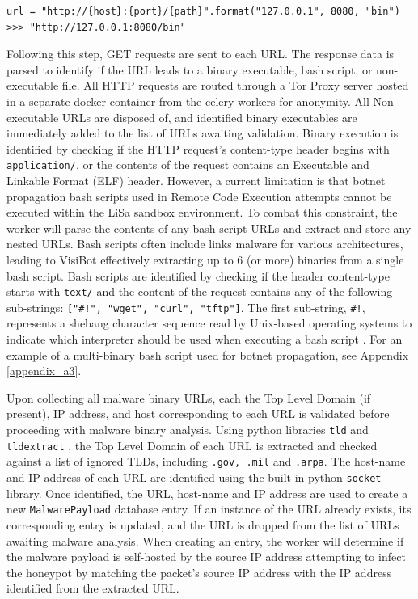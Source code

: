 \begin{lstlisting}
url = "http://{host}:{port}/{path}".format("127.0.0.1", 8080, "bin")
>>> "http://127.0.0.1:8080/bin"
\end{lstlisting}

Following this step, GET requests are sent to each URL. The response data is parsed to identify if the URL leads to a binary executable, bash script, or non-executable file. All HTTP requests are routed through a Tor Proxy server hosted in a separate docker container from the celery workers for anonymity. All Non-executable URLs are disposed of, and identified binary executables are immediately added to the list of URLs awaiting validation. Binary execution is identified by checking if the HTTP request's content-type header begins with \texttt{application/}, or the contents of the request contains an Executable and Linkable Format (ELF) header. However, a current limitation is that botnet propagation bash scripts used in Remote Code Execution attempts cannot be executed within the LiSa sandbox environment. To combat this constraint, the worker will parse the contents of any bash script URLs and extract and store any nested URLs. Bash scripts often include links malware for various architectures, leading to VisiBot effectively extracting up to 6 (or more) binaries from a single bash script. Bash scripts are identified by checking if the header content-type starts with \texttt{text/} and the content of the request contains any of the following sub-strings: \texttt{["\#!", "wget", "curl", "tftp"]}. The first sub-string, \texttt{\#!}, represents a shebang character sequence read by Unix-based operating systems to indicate which interpreter should be used when executing a bash script \citep{Shebang}. For an example of a multi-binary bash script used for botnet propagation, see Appendix \ref{appendix_a3}.

Upon collecting all malware binary URLs, each the Top Level Domain (if present), IP address, and host corresponding to each URL is validated before proceeding with malware binary analysis. Using python libraries \texttt{tld} and \texttt{tldextract} \citep{TLD, TLDExtract}, the Top Level Domain of each URL is extracted and checked against a list of ignored TLDs, including \texttt{.gov, .mil} and \texttt{.arpa}. The host-name and IP address of each URL are identified using the built-in python \texttt{socket} library. \citep{PythonSocket} Once identified, the URL, host-name and IP address are used to create a new \texttt{MalwarePayload} database entry. If an instance of the URL already exists, its corresponding entry is updated, and the URL is dropped from the list of URLs awaiting malware analysis. When creating an entry, the worker will determine if the malware payload is self-hosted by the source IP address attempting to infect the honeypot by matching the packet's source IP address with the IP address identified from the extracted URL. 

